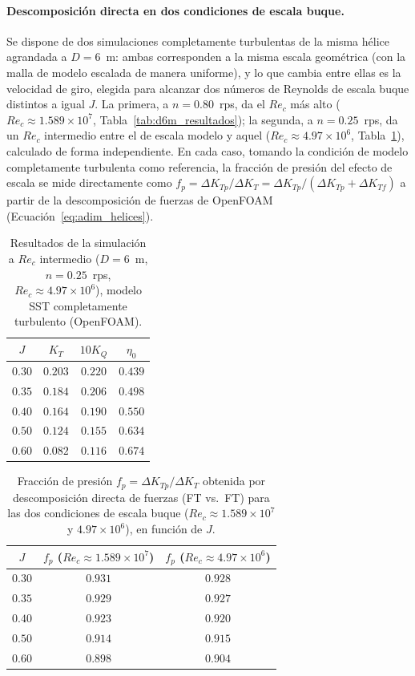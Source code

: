 \paragraph{Descomposición directa en dos condiciones de escala buque.} Se dispone de dos
simulaciones completamente turbulentas de la misma hélice agrandada a $D=6$~m: ambas
corresponden a la misma escala geométrica (con la malla de modelo escalada de manera uniforme), y lo que cambia entre ellas es la velocidad de giro, elegida para alcanzar
dos números de Reynolds de escala buque distintos a igual $J$. La primera, a $n=0.80$~rps,
da el $Re_c$ más alto ($Re_c\approx1.589\times10^7$, Tabla~\ref{tab:d6m_resultados}); la
segunda, a $n=0.25$~rps, da un $Re_c$ intermedio entre el de escala modelo y aquel
($Re_c\approx4.97\times10^6$, Tabla~\ref{tab:reint_resultados}), calculado de forma
independiente. En cada caso,
tomando la condición de modelo completamente turbulenta como referencia, la fracción de
presión del efecto de escala se mide directamente como
$f_p=\Delta K_{Tp}/\Delta K_T=\Delta K_{Tp}/(\Delta K_{Tp}+\Delta K_{Tf})$ a partir de la
descomposición de fuerzas de OpenFOAM (Ecuación~\ref{eq:adim_helices}).

\begin{table}[htpb]
\centering
\caption{Resultados de la simulación a $Re_c$ intermedio ($D=6$~m, $n=0.25$~rps,
$Re_c\approx4.97\times10^6$), modelo SST completamente turbulento (OpenFOAM).}
\label{tab:reint_resultados}
\begin{tabular}{cccc}
\hline
$J$ & $K_T$ & $10K_Q$ & $\eta_0$ \\
\hline
$0.30$ & $0.203$ & $0.220$ & $0.439$ \\
$0.35$ & $0.184$ & $0.206$ & $0.498$ \\
$0.40$ & $0.164$ & $0.190$ & $0.550$ \\
$0.50$ & $0.124$ & $0.155$ & $0.634$ \\
$0.60$ & $0.082$ & $0.116$ & $0.674$ \\
\hline
\end{tabular}
\end{table}

\begin{table}[htpb]
\centering
\caption{Fracción de presión $f_p = \Delta K_{Tp}/\Delta K_T$ obtenida por
descomposición directa de fuerzas (FT vs.\ FT) para las dos condiciones de escala buque
($Re_c\approx1.589\times10^7$ y $4.97\times10^6$), en función de $J$.}
\label{tab:fp_directo}
\begin{tabular}{ccc}
\hline
$J$ & $f_p$ ($Re_c\approx1.589\times10^7$) & $f_p$ ($Re_c\approx4.97\times10^6$) \\
\hline
$0.30$ & $0.931$ & $0.928$ \\
$0.35$ & $0.929$ & $0.927$ \\
$0.40$ & $0.923$ & $0.920$ \\
$0.50$ & $0.914$ & $0.915$ \\
$0.60$ & $0.898$ & $0.904$ \\
\hline
\end{tabular}
\end{table}


